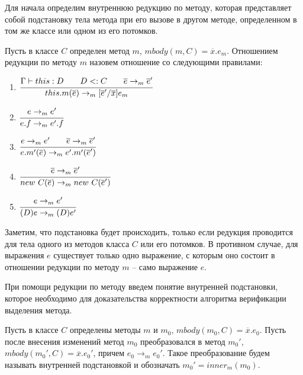 Для начала определим внутреннюю редукцию по методу,
которая представляет собой подстановку тела метода при его вызове в другом методе,
определенном в том же классе или одном из его потомков.
\begin{definition}
Пусть в классе $C$ определен метод $m$, $mbody(m, C) = \overline{x}.e_m$.
Отношением редукции по методу $m$ назовем отношение со следующими правилами:
\begin{enumerate}
    \item $\cfrac{\Gamma \vdash this : D \qquad D <: C \qquad \overline{e} \rightarrow_m \overline{e}'}{this.m(\overline{e}) \rightarrow_m [\overline{e}'/\overline{x}]e_m}$
    \item $\cfrac{e \rightarrow_m e'}{e.f \rightarrow_m e'.f}$
    \item $\cfrac{e \rightarrow_m e' \qquad \overline{e} \rightarrow_m \overline{e}'}{e.m'(\overline{e}) \rightarrow_m e'.m'(\overline{e}')}$
    \item $\cfrac{\overline{e} \rightarrow_m \overline{e}'}{new\ C(\overline{e}) \rightarrow_m new\ C(\overline{e}')}$
    \item $\cfrac{e \rightarrow_m e'}{(D)e \rightarrow_m (D)e'}$
\end{enumerate}
\end{definition}
Заметим, что подстановка будет происходить, только если редукция проводится для тела одного из методов класса $C$ или его потомков.
В противном случае, для выражения $e$ существует только одно выражение, с которым оно состоит в отношении редукции по методу $m$ -- само выражение $e$.

При помощи редукции по методу введем понятие внутренней подстановки, которое необходимо для доказательства корректности алгоритма верификации выделения метода.
\begin{definition}
Пусть в классе $C$ определены методы $m$ и $m_0$, $mbody(m_0, C) = \overline{x}.e_0$.
Пусть после внесения изменений метод $m_0$ преобразовался в метод $m_0'$, $mbody(m_0', C) = \overline{x}.e_0'$, причем $e_0 \rightarrow_m e_0'$.
Такое преобразование будем называть внутренней подстановкой и обозначать $m_0' = inner_m(m_0)$.
\end{definition}

